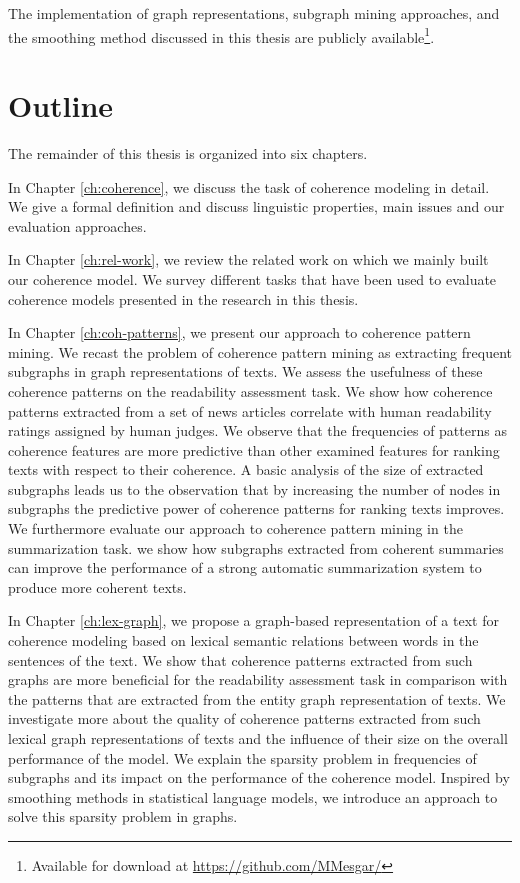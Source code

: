 The implementation of graph representations, subgraph mining approaches, and the smoothing method discussed in this thesis are publicly available\footnote{Available for download at \url{https://github.com/MMesgar/}}. 


\section{Outline}
\label{sec:intro-outline}
The remainder of this thesis is organized into six chapters. 

In Chapter \ref{ch:coherence}, we discuss the task of coherence modeling in detail. 
We give a formal definition and discuss linguistic properties, main issues and our evaluation approaches. 

In Chapter \ref{ch:rel-work}, we review the related work on which we mainly built our coherence model. 
We survey different tasks that have been used to evaluate coherence models presented in the research in this thesis. 

In Chapter \ref{ch:coh-patterns}, we present our approach to coherence pattern mining. 
We recast the problem of coherence pattern mining as extracting frequent subgraphs in graph representations of texts. 
We assess the usefulness of these coherence patterns on the readability assessment task. 
We show how coherence patterns extracted from a set of news articles correlate with human readability ratings assigned by human judges. 
We observe that the frequencies of patterns as coherence features are more predictive than other examined features for ranking texts with respect to their coherence. 
A basic analysis of the size of extracted subgraphs leads us to the observation that by increasing the number of nodes in subgraphs the predictive power of coherence patterns for ranking texts improves. 
We furthermore evaluate our approach to coherence pattern mining in the summarization task.  
we show how subgraphs extracted from coherent summaries can improve the performance of a strong automatic summarization system to produce more coherent texts. 

In Chapter \ref{ch:lex-graph}, we propose a graph-based representation of a text for coherence modeling based on lexical semantic relations between words in the sentences of the text.  
We show that coherence patterns extracted from such graphs are more beneficial for the readability assessment task in comparison with the patterns that are extracted from the entity graph representation of texts.  
We investigate more about the quality of coherence patterns extracted from such lexical graph representations of texts and the influence of their size on the overall performance of the model.   
We explain the sparsity problem in frequencies of subgraphs and its impact on the performance of the coherence model. Inspired by smoothing methods in statistical language models, we introduce an approach to solve this sparsity problem in graphs.  

